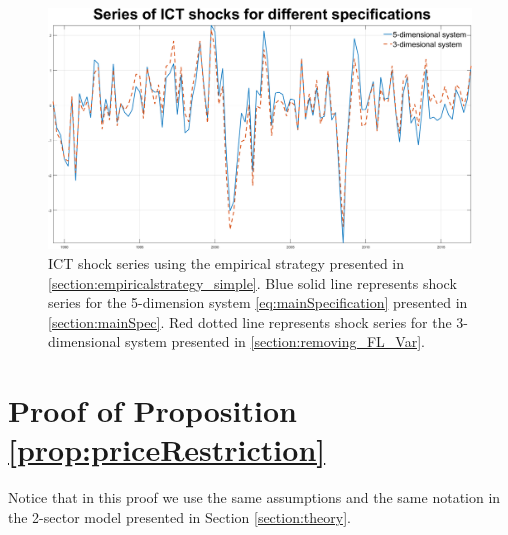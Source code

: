 \documentclass[12pt]{article}
\begin{document}
 
 	\begin{figure}[h!]
 	\begin{center}
 		\includegraphics[scale=0.35]{MainFigures/Removing_FLVariables}
 		\caption{ICT shock series using the empirical strategy presented in \ref{section:empiricalstrategy_simple}. Blue solid line represents shock series for the 5-dimension system \ref{eq:mainSpecification} presented in \ref{section:mainSpec}. Red dotted line represents shock series for the 3-dimensional system presented in \ref{section:removing_FL_Var}.}
 		\label{fig:shockSeries_removing}
 	\end{center} 
 \end{figure}

\newpage

\section{Proof of Proposition \ref{prop:priceRestriction}}\label{section:proofpriceRestriction}

Notice that in this proof we use the same assumptions and the same notation in the 2-sector model presented in Section \ref{section:theory}.

\
\end{document}

